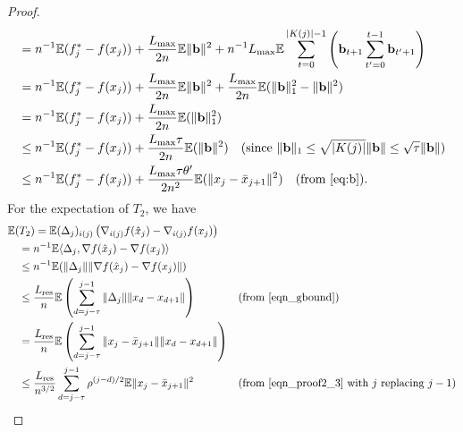 \documentclass{siamltex}
\begin{document}
\begin{proof}
\begin{align}
\nonumber
& = n^{-1}{\mathbb{E}} (f^*_j- f(x_{j})) + {{L_{\mbox{\rm\scriptsize max}}}\over 2n} {\mathbb{E}} \|\bold{b}\|^2 +n^{-1} {L_{\mbox{\rm\scriptsize max}}}{\mathbb{E}} \sum_{t=0}^{|K(j)|-1} \left( \bold{b}_{t+1} \sum_{t'=0}^{t-1} \bold{b}_{t'+1} \right) \\
\nonumber
& = n^{-1}{\mathbb{E}} (f^*_j- f(x_{j})) + {{L_{\mbox{\rm\scriptsize max}}}\over 2n} {\mathbb{E}} \|\bold{b}\|^2 + {{L_{\mbox{\rm\scriptsize max}}} \over 2n} {\mathbb{E}}(\| \bold{b} \|_1^2 - \|\bold{b}\|^2) \\
\nonumber
& = n^{-1}{\mathbb{E}} (f^*_j- f(x_{j})) + {{L_{\mbox{\rm\scriptsize max}}} \over 2n} {\mathbb{E}}( \| \bold{b}\|_1^2 ) \\
\nonumber
& \leq n^{-1}{\mathbb{E}} (f^*_j- f(x_{j})) + {{L_{\mbox{\rm\scriptsize max}}} \tau \over 2n} {\mathbb{E}}(\|\bold{b}\|^2) \quad (\text{since $\|\bold{b}\|_1 \leq \sqrt{|K(j)|}\|\bold{b}\| \leq \sqrt{\tau}\|\bold{b}\|$})
\\
&\leq n^{-1}{\mathbb{E}} (f^*_j- f(x_{j})) + {{L_{\mbox{\rm\scriptsize max}}} \tau\theta' \over 2n^2} {\mathbb{E}}(\|x_j-\bar{x}_{j+1}\|^2) \quad (\text{from \eqref{eq:b}}).
\label{eq:bT1}
\end{align}
For the expectation of $T_2$, we have \\
\vspace{-10mm}
\begin{alignat}{2}
\nonumber
&{\mathbb{E}}(T_2) ={\mathbb{E}}  (\Delta_j)_{i(j)} \left( \nabla_{i(j)} f({\hat{x}}_{j}) - \nabla_{i(j)} f(x_{j}) \right) && \\
\nonumber
&\quad= n^{-1}{\mathbb{E}} \langle \Delta_j, \nabla f({\hat{x}}_{j}) - \nabla f(x_j) \rangle && \\
\nonumber
&\quad\leq n^{-1} {\mathbb{E}} (\|\Delta_j\| \|\nabla f({\hat{x}}_{j}) - \nabla f(x_j)\|) && \\
\nonumber
&\quad\leq {{L_{\mbox{\rm\scriptsize res}}} \over n} {\mathbb{E}} \left( \sum_{d=j-\tau}^{j-1} \|\Delta_j\| \|x_{d} - x_{d+1}\| \right) \quad && (\text{from \eqref{eqn_gbound}})\\
\nonumber
&\quad= \frac{L_{\mbox{\rm\scriptsize res}}}{n} {\mathbb{E}} \left( \sum_{d=j-\tau}^{j-1} \|x_j-\bar{x}_{j+1}\| \|x_{d} - x_{d+1}\| \right) && \\
\nonumber
&\quad\leq \frac{L_{\mbox{\rm\scriptsize res}}}{n^{3/2}} \sum_{d=j-\tau}^{j-1} \rho^{(j-d)/2}{\mathbb{E}}\|x_j-\bar{x}_{j+1}\|^2 
\quad && (\text{from \eqref{eqn_proof2_3} with $j$ replacing $j-1$})\\
\label{eq:bT2}

\end{alignat}
\end{proof}
\end{document}
